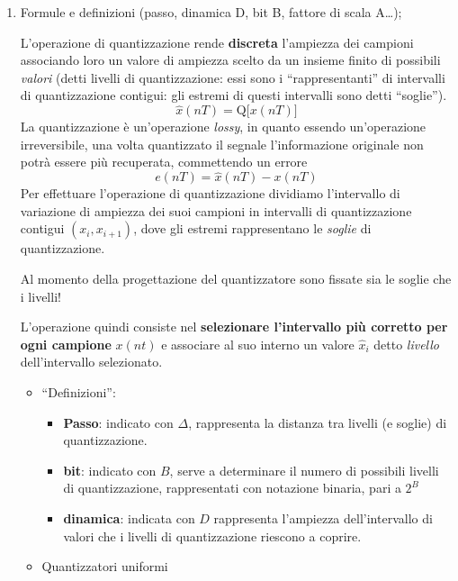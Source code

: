 \documentclass[
]{article}
\providecommand{\tightlist}{%
  \setlength{\itemsep}{0pt}\setlength{\parskip}{0pt}}
\begin{document}
\begin{enumerate}
\def\labelenumi{\arabic{enumi}.}
\setcounter{enumi}{29}
\item
  Formule e definizioni (passo, dinamica D, bit B, fattore di scala
  A\ldots);

  L'operazione di quantizzazione rende \textbf{discreta} l'ampiezza dei
  campioni associando loro un valore di ampiezza scelto da un insieme
  finito di possibili \emph{valori} (detti livelli di quantizzazione:
  essi sono i ``rappresentanti'' di intervalli di quantizzazione
  contigui: gli estremi di questi intervalli sono detti ``soglie''). \[
  \hat{x}(nT) = \text{Q}\Big[x(nT)\Big]
  \] La quantizzazione è un'operazione \emph{lossy}, in quanto essendo
  un'operazione irreversibile, una volta quantizzato il segnale
  l'informazione originale non potrà essere più recuperata, commettendo
  un errore \[
  e(nT)=\hat{x}(nT)-x(nT)
  \] Per effettuare l'operazione di quantizzazione dividiamo
  l'intervallo di variazione di ampiezza dei suoi campioni in intervalli
  di quantizzazione contigui \((x_i, x_{i+1})\), dove gli estremi
  rappresentano le \emph{soglie} di quantizzazione.

  Al momento della progettazione del quantizzatore sono fissate sia le
  soglie che i livelli!

  L'operazione quindi consiste nel \textbf{selezionare l'intervallo più
  corretto per ogni campione} \(x(nt)\) e associare al suo interno un
  valore \(\hat{x}_i\) detto \emph{livello} dell'intervallo selezionato.

  \begin{itemize}
  \item
    ``Definizioni'':

    \begin{itemize}
    \tightlist
    \item
      \textbf{Passo}: indicato con \(\Delta\), rappresenta la distanza
      tra livelli (e soglie) di quantizzazione.
    \item
      \textbf{bit}: indicato con \(B\), serve a determinare il numero di
      possibili livelli di quantizzazione, rappresentati con notazione
      binaria, pari a \(2^{B}\)
    \item
      \textbf{dinamica}: indicata con \(D\) rappresenta l'ampiezza
      dell'intervallo di valori che i livelli di quantizzazione riescono
      a coprire.
    \end{itemize}
  \item
    Quantizzatori uniformi


\end{itemize}
\end{enumerate}
\end{document}
